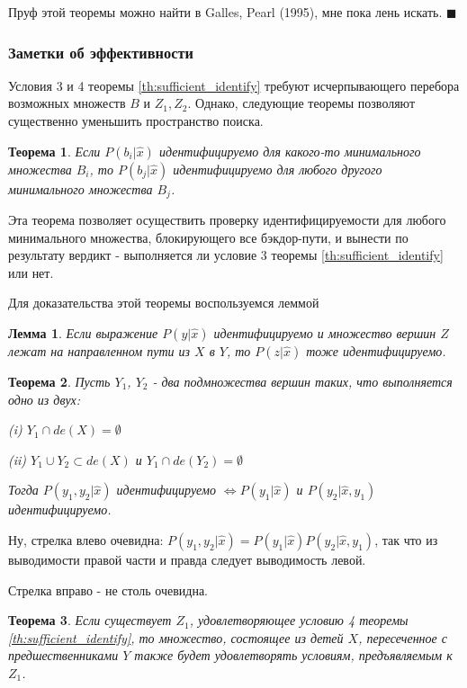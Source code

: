 \documentclass[fleqn]{article}
\newtheorem{theorem}{Теорема}
\newtheorem{lemma}{Лемма}
\numberwithin{equation}{section}
\numberwithin{theorem}{section}
\numberwithin{figure}{section}
\numberwithin{lemma}{section}
\numberwithin{corollary}{section}
\begin{document}
Пруф этой теоремы можно найти в Galles, Pearl (1995), мне пока лень искать.
$\blacksquare$

\subsubsection*{Заметки об эффективности}

Условия 3 и 4 теоремы \ref{th:sufficient_identify} требуют исчерпывающего перебора возможных множеств $B$ и $Z_1, Z_2$. Однако, следующие теоремы позволяют существенно уменьшить пространство поиска.

\begin{theorem}
	Если $P(b_i|\hat x)$ идентифицируемо для какого-то минимального множества $B_i$, то $P(b_j|\hat x)$ идентифицируемо для любого другого минимального множества $B_j$.
\end{theorem}

Эта теорема позволяет осуществить проверку идентифицируемости для любого минимального множества, блокирующего все бэкдор-пути, и вынести по результату вердикт - выполняется ли условие 3 теоремы \ref{th:sufficient_identify} или нет.

Для доказательства этой теоремы воспользуемся леммой

\begin{lemma}
	Если выражение $P(y|\hat x)$ идентифицируемо и множество вершин $Z$ лежат на направленном пути из $X$ в $Y$, то $P(z|\hat x)$ тоже идентифицируемо.
\end{lemma}

\begin{theorem}
	Пусть $Y_1$, $Y_2$ - два подмножества вершин таких, что выполняется одно из двух:
	
	(i) $Y_1 \cap de(X) = \emptyset$
	
	(ii) $Y_1 \cup Y_2 \subset de(X)$ и $Y_1 \cap de(Y_2) = \emptyset$

Тогда $P(y_1, y_2 | \hat x)$ идентифицируемо $\iff P(y_1|\hat x)$ и $P(y_2|\hat x, y_1)$ идентифицируемо.
\end{theorem}

Ну, стрелка влево очевидна: $P(y_1, y_2 | \hat x) = P(y_1|\hat x)P(y_2|\hat x, y_1)$, так что из выводимости правой части и правда следует выводимость левой. 

Стрелка вправо - не столь очевидна.

\begin{theorem}
	Если существует $Z_1$, удовлетворяющее условию 4 теоремы \ref{th:sufficient_identify}, то множество, состоящее из детей $X$, пересеченное с предшественниками $Y$ также будет удовлетворять условиям, предъявляемым к $Z_1$. 
\end{theorem}
\end{document}
